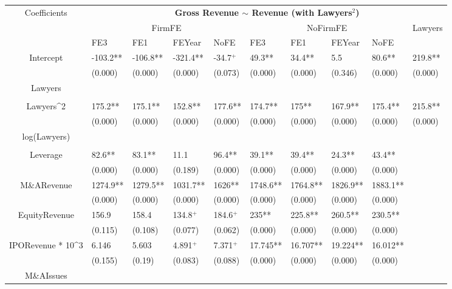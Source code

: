 \documentclass{article}
\begin{document}
\begin{table}[H]
\centering
\begin{tabular}{|clllllllll|}
\hline
\multirow{3}{*}{Coefficients} & \multicolumn{9}{c|}{\textbf{Gross Revenue $\sim$ Revenue (with Lawyers$^2$)}} \\
\cline{2-10}
& \multicolumn{4}{c}{FirmFE} & \multicolumn{4}{c}{NoFirmFE} & \multirow{2}{*}{Lawyers} \\
\cline{2-9}
& FE3 & FE1 & FEYear & NoFE & FE3 & FE1 & FEYear & NoFE &  \\
\hline
 
Intercept & -103.2** & -106.8** & -321.4** & -34.7$^{+}$ & 49.3** & 34.4** & 5.5 & 80.6** & 219.8** \\ 
   & (0.000) & (0.000) & (0.000) & (0.073) & (0.000) & (0.000) & (0.346) & (0.000) & (0.000) \\ 
  Lawyers &  &  &  &  &  &  &  &  &  \\ 
   &  &  &  &  &  &  &  &  &  \\ 
  Lawyers^2 & 175.2** & 175.1** & 152.8** & 177.6** & 174.7** & 175** & 167.9** & 175.4** & 215.8** \\ 
   & (0.000) & (0.000) & (0.000) & (0.000) & (0.000) & (0.000) & (0.000) & (0.000) & (0.000) \\ 
  log(Lawyers) &  &  &  &  &  &  &  &  &  \\ 
   &  &  &  &  &  &  &  &  &  \\ 
  Leverage & 82.6** & 83.1** & 11.1 & 96.4** & 39.1** & 39.4** & 24.3** & 43.4** &  \\ 
   & (0.000) & (0.000) & (0.189) & (0.000) & (0.000) & (0.000) & (0.000) & (0.000) &  \\ 
  M\&ARevenue & 1274.9** & 1279.5** & 1031.7** & 1626** & 1748.6** & 1764.8** & 1826.9** & 1883.1** &  \\ 
   & (0.000) & (0.000) & (0.000) & (0.000) & (0.000) & (0.000) & (0.000) & (0.000) &  \\ 
  EquityRevenue & 156.9 & 158.4 & 134.8$^{+}$ & 184.6$^{+}$ & 235** & 225.8** & 260.5** & 230.5** &  \\ 
   & (0.115) & (0.108) & (0.077) & (0.062) & (0.000) & (0.000) & (0.000) & (0.000) &  \\ 
  IPORevenue * 10^3 & 6.146 & 5.603 & 4.891$^{+}$ & 7.371$^{+}$ & 17.745** & 16.707** & 19.224** & 16.012** &  \\ 
   & (0.155) & (0.19) & (0.083) & (0.088) & (0.000) & (0.000) & (0.000) & (0.000) &  \\ 
  M\&AIssues &  &  &  &  &  &  &  &  &  \\ 

\end{tabular}
\end{table}
\end{document}

